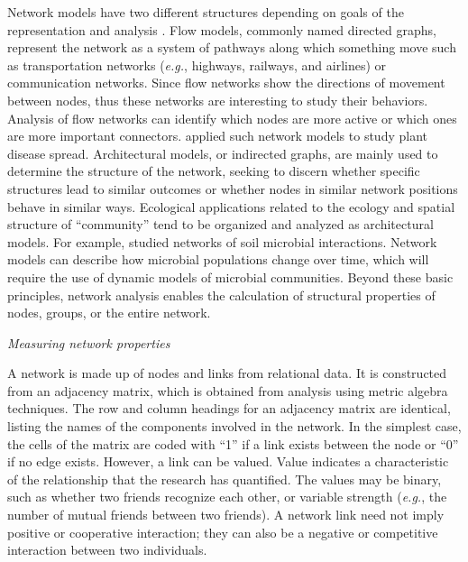 Network models have two different structures depending on goals of the representation and analysis \citep{borgatti2013analyzing}. Flow models, commonly named directed graphs, represent the network as a system of pathways along which something move such as transportation networks (\textit{e.g.}, highways, railways, and airlines) or communication networks. Since flow networks show the directions of movement between nodes, thus these networks are interesting to study their behaviors. Analysis of flow networks can identify which nodes are more active or which ones are more important connectors. \citet{Jeger:2007tn,Shaw:2014cka} applied such network models to study plant disease spread. Architectural models, or indirected graphs, are mainly used to determine the structure of the network, seeking to discern whether specific structures lead to similar outcomes or whether nodes in similar network positions behave in similar ways. Ecological applications related to the ecology and spatial structure of ``community'' tend to be organized and analyzed as architectural models. For example, \citet{Faust:2012dk} studied networks of soil microbial interactions. Network models can describe how microbial populations change over time, which will require the use of dynamic models of microbial communities. Beyond these basic principles, network analysis enables the calculation of structural properties of nodes, groups, or the entire network.

\textit{Measuring network properties}

A network is made up of nodes and links from relational data. It is constructed from an adjacency matrix, which is obtained from analysis using metric algebra techniques. The row and column headings for an adjacency matrix are identical, listing the names of the components involved in the network. In the simplest case, the cells of the matrix are coded with ``1'' if a link exists between the node or ``0'' if no edge exists. However, a link can be valued. Value indicates a characteristic of the relationship that the research has quantified. The values may be binary, such as whether two friends recognize each other, or variable strength (\textit{e.g.}, the number of mutual friends between two friends). A network link need not imply positive or cooperative interaction; they can also be a negative or competitive interaction between two individuals. 

